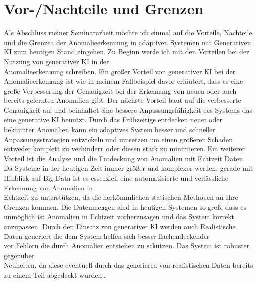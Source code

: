 \chapter{Vor-/Nachteile und Grenzen}
\label{ch:zsfg}
Als Abschluss meiner Seminararbeit möchte ich einmal auf die Vorteile, Nachteile und die Grenzen der Anomalieerkennung in adaptiven Systemen mit Generativen KI zum heutigen Stand eingehen. Zu Beginn werde ich mit den Vorteilen bei der Nutzung von generativer KI in der \\ Anomalieerkennung schreiben. Ein großer Vorteil von generativer KI bei der Anomalieerkennung ist wie in meinem Fallbeispiel davor erläutert, dass es eine große Verbesserung der Genauigkeit bei der Erkennung von neuen oder auch bereits gelernten Anomalien gibt. Der nächste Vorteil baut auf die verbesserte Genauigkeit auf und beinhaltet eine bessere Anpassungsfähigkeit des Systems das eine generative KI benutzt. Durch das Frühzeitige entdecken neuer oder bekannter Anomalien kann ein adaptives System besser und schneller Anpassungsstrategien entwickeln und umsetzen um einen größeren Schaden entweder komplett zu verhindern oder diesen stark zu minimieren. Ein weiterer Vorteil ist die Analyse und die Entdeckung von Anomalien mit Echtzeit Daten. \\ Da Systeme in der heutigen Zeit immer größer und komplexer werden, gerade mit Hinblick auf Big-Data ist es essenziell eine automatisierte und verlässliche Erkennung von Anomalien in \\ Echtzeit zu unterstützen, da die herkömmlichen statischen Methoden an Ihre Grenzen kommen. Die Datenmengen sind in heutigen Systemen so groß, dass es unmöglich ist Anomalien in Echtzeit vorherzusagen und das System korrekt anzupassen. Durch den Einsatz von generativer KI werden auch Realistische Daten generiert die dem System helfen sich besser flächendeckender \\ vor Fehlern die durch Anomalien entstehen zu schützen. Das System ist robuster gegenüber \\ Neuheiten, da diese eventuell durch das generieren von realistischen Daten bereits zu einem Teil abgedeckt wurden \cite{Fallbeispiel}\cite{Roadmap}. 
\nAbsatz
